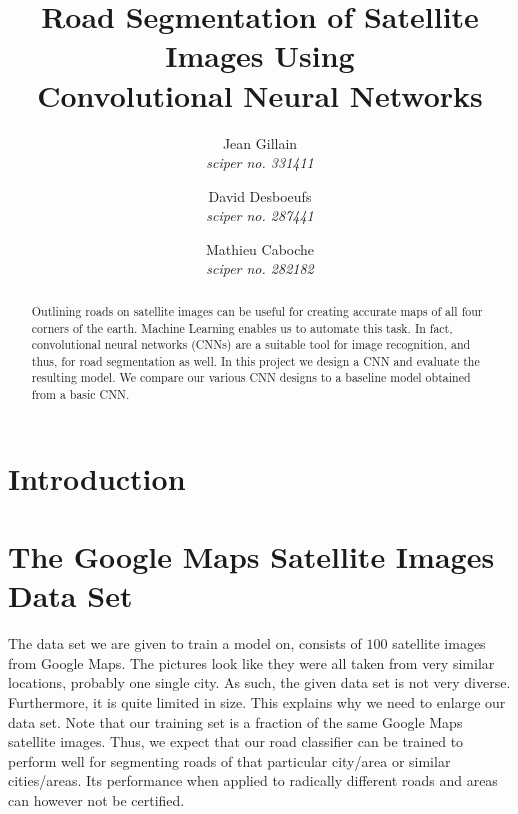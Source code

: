 \documentclass[10pt,conference,compsocconf]{IEEEtran}
\begin{document}
\title{Road Segmentation of Satellite Images Using \\ Convolutional Neural Networks}

\author{
	Jean Gillain\\
	\textit{sciper no. 331411}
	\and
	 David Desboeufs\\
	 \textit{sciper no. 287441}
	 \and 
	 Mathieu Caboche\\
	 \textit{sciper no. 282182}
}

\maketitle

\begin{abstract}
	Outlining roads on satellite images can be useful for creating accurate maps of all four corners of the earth. Machine Learning enables us to automate this task. In fact, convolutional neural networks (CNNs) are a suitable tool for image recognition, and thus, for road segmentation as well. In this project we design a CNN and evaluate the resulting model. We compare our various CNN designs to a baseline model obtained from a basic CNN.
	
\end{abstract}

\section{Introduction}



\section{The Google Maps Satellite Images Data Set}
\label{sec:dataset}
The data set we are given to train a model on, consists of $100$ satellite images from Google Maps. The pictures look like they were all taken from very similar locations, probably one single city. As such, the given data set is not very diverse. Furthermore, it is quite limited in size. This explains why we need to enlarge our data set. Note that our training set is a fraction of the same Google Maps satellite images. Thus, we expect that our road classifier can be trained to perform well for segmenting roads of that particular city/area or similar cities/areas. Its performance when applied to radically different roads and areas can however not be certified.
\end{document}
